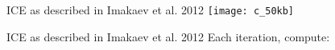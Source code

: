 %


\begin{frame}[c]{ICE as described in Imakaev et al. 2012 \cite{imakaev2012iterative}}
    \texttt{[image: c\_50kb]}
\end{frame}

\begin{frame}[c]{ICE as described in Imakaev et al. 2012 \cite{imakaev2012iterative}}
    \Large
    Each iteration, compute:
    \pause
    \vspace*{-\baselineskip}
\end{frame}







